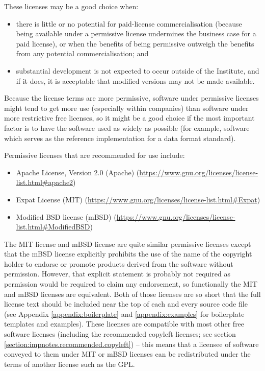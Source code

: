 \documentclass[10pt,a4paper]{article}
\begin{document}
\par These licenses may be a good choice when:
\begin{itemize}
\item there is little or no potential for paid-license commercialisation (because being available under a permissive license undermines 
the business case for a paid license), or when the benefits of being permissive outweigh 
the benefits from any potential commercialisation; and 
\item substantial development is not expected to occur outside of the Institute, and if it does, it is acceptable that modified versions may not be made available. 
\end{itemize}
Because the license terms are 
more permissive, software under permissive licenses might tend to get more use 
(especially within companies) than software under more restrictive free licenses, 
so it might be a good choice if the most important factor is to have the software used 
as widely as possible (for example, software which serves as the reference 
implementation for a data format standard). 

\par Permissive licenses that are recommended for use include: 
\begin{itemize}
\item Apache License, Version 2.0 (Apache) (\url{https://www.gnu.org/licenses/license-list.html#apache2})
\item Expat License (MIT) (\url{https://www.gnu.org/licenses/license-list.html#Expat})
\item Modified BSD license (mBSD) (\url{https://www.gnu.org/licenses/license-list.html#ModifiedBSD})
\end{itemize}

The MIT license and mBSD license are quite similar permissive licenses except that the 
mBSD license explicitly prohibits the use of the name of the copyright holder to endorse 
or promote products derived from the software without permission. However, that explicit 
statement is probably not required as permission would be required to claim any 
endorsement, so functionally the MIT and mBSD licenses are equivalent. Both of those 
licenses are so short that the full license text should be included near the top of each and 
every source code file (see Appendix \ref{appendix:boilerplate} and \ref{appendix:examples} 
for boilerplate templates and examples). These licenses are compatible with most other 
free software licenses (including the recommended copyleft licenses; see section 
\ref{section:impnotes.recommended.copyleft}) -- this means that a licensee of software 
conveyed to them under MIT or mBSD licenses can be redistributed under the terms of 
another license such as the GPL. 
\end{document}
